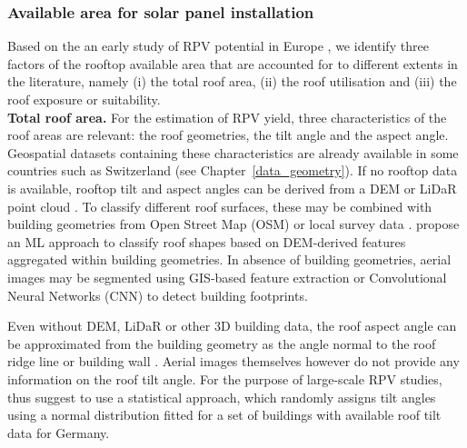 \subsubsection{Available area for solar panel installation}

Based on the an early study of RPV potential in Europe \cite{iea_potential_2002}, we identify three factors of the rooftop available area that are accounted for to different extents in the literature, namely (i) the total roof area, (ii) the roof utilisation and (iii) the roof exposure or suitability. 
\\

\textbf{Total roof area.} For the estimation of RPV yield, three characteristics of the roof areas are relevant: the roof geometries, the tilt angle and the aspect angle. Geospatial datasets containing these characteristics are already available in some countries such as Switzerland (see Chapter~\ref{data_geometry}).
If no rooftop data is available, rooftop tilt and aspect angles can be derived from a DEM \cite{ramirez_camargo_spatio-temporal_2015} or LiDaR point cloud \cite{buffat_feature-aware_2016,nguyen_incorporating_2012}.
To classify different roof surfaces, these may be combined with building geometries from Open Street Map (OSM) or local survey data \cite{ramirez_camargo_spatio-temporal_2015}.
\citet{mohajeri_city-scale_2018} propose an ML approach to classify roof shapes based on DEM-derived features aggregated within building geometries.
In absence of building geometries, aerial images may be segmented using GIS-based feature extraction \cite{wiginton_quantifying_2010} or Convolutional Neural Networks (CNN) \cite{zhao_object-based_2017} to detect building footprints.

Even without DEM, LiDaR or other 3D building data, the roof aspect angle can be approximated from the building geometry as the angle normal to the roof ridge line or building wall \cite{mainzer_assessment_2017}. 
Aerial images themselves however do not provide any information on the roof tilt angle.
For the purpose of large-scale RPV studies, \citet{mainzer_assessment_2017} thus suggest to use a statistical approach, which randomly assigns tilt angles using a normal distribution fitted for a set of buildings with available roof tilt data for Germany.

